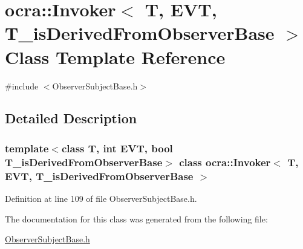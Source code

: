 \hypertarget{classocra_1_1Invoker}{}\section{ocra\+:\+:Invoker$<$ T, E\+VT, T\+\_\+is\+Derived\+From\+Observer\+Base $>$ Class Template Reference}
\label{classocra_1_1Invoker}


{\ttfamily \#include $<$Observer\+Subject\+Base.\+h$>$}



\subsection{Detailed Description}
\subsubsection*{template$<$class T, int E\+VT, bool T\+\_\+is\+Derived\+From\+Observer\+Base$>$\newline
class ocra\+::\+Invoker$<$ T, E\+V\+T, T\+\_\+is\+Derived\+From\+Observer\+Base $>$}



Definition at line 109 of file Observer\+Subject\+Base.\+h.



The documentation for this class was generated from the following file\+:\begin{DoxyCompactItemize}
\item 
\hyperlink{ObserverSubjectBase_8h}{Observer\+Subject\+Base.\+h}\end{DoxyCompactItemize}
